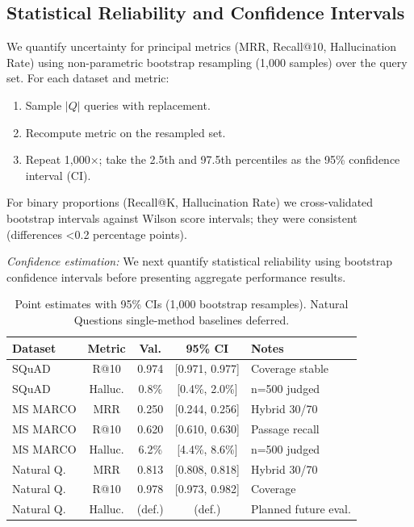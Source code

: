 \documentclass[conference]{IEEEtran}
\begin{document}

\subsection{Statistical Reliability and Confidence Intervals}
We quantify uncertainty for principal metrics (MRR, Recall@10, Hallucination Rate) using non-parametric bootstrap resampling (1,000 samples) over the query set. For each dataset and metric:
\begin{enumerate}
  \item Sample \(|Q|\) queries with replacement.
  \item Recompute metric on the resampled set.
  \item Repeat 1,000×; take the 2.5th and 97.5th percentiles as the 95\% confidence interval (CI).
\end{enumerate}
For binary proportions (Recall@K, Hallucination Rate) we cross-validated bootstrap intervals against Wilson score intervals; they were consistent (differences <0.2 percentage points).

\noindent\textit{Confidence estimation:} We next quantify statistical reliability using bootstrap confidence intervals before presenting aggregate performance results.

\begin{table}[ht]
\centering
\caption{Point estimates with 95\% CIs (1,000 bootstrap resamples). Natural Questions single-method baselines deferred.}
\label{tab:confidence}
\begingroup
\setlength{\tabcolsep}{3.5pt}
\small
\begin{tabularx}{\columnwidth}{@{}l c c c X@{}}
\toprule
\textbf{Dataset} & \textbf{Metric} & \textbf{Val.} & \textbf{95\% CI} & \textbf{Notes} \\
\midrule
SQuAD & R@10 & 0.974 & [0.971, 0.977] & Coverage \allowbreak stable \\
SQuAD & Halluc. & 0.8\% & [0.4\%, 2.0\%] & n=500 judged \\
MS MARCO & MRR & 0.250 & [0.244, 0.256] & Hybrid 30/70 \\
MS MARCO & R@10 & 0.620 & [0.610, 0.630] & Passage recall \\
MS MARCO & Halluc. & 6.2\% & [4.4\%, 8.6\%] & n=500 judged \\
Natural Q. & MRR & 0.813 & [0.808, 0.818] & Hybrid 30/70 \\
Natural Q. & R@10 & 0.978 & [0.973, 0.982] & Coverage \\
Natural Q. & Halluc. & (def.) & (def.) & Planned future eval. \\
\bottomrule
\end{tabularx}
\endgroup
\end{table}
\end{document}
